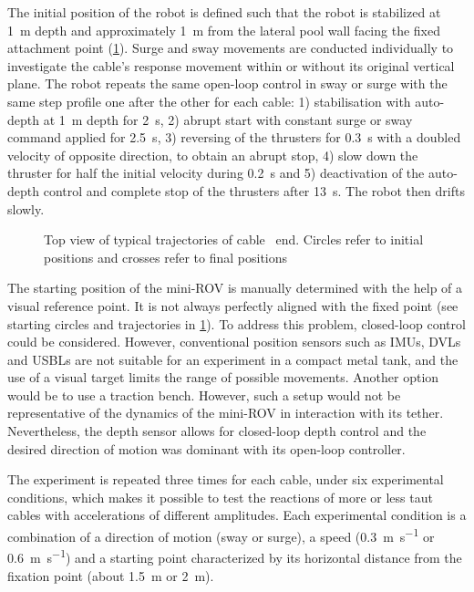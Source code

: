 The initial position of the robot is defined such that the robot is stabilized at \qty{1}{\m} depth
and approximately \qty{1}{\m} from the lateral pool wall facing the fixed attachment point
(\cref{cable_modelization_fig_all_trajectories}). Surge and sway movements are conducted
individually to investigate the cable's response movement within or without its original vertical
plane. The robot repeats the same open-loop control in sway or surge with the same step profile one
after the other for each cable: 1) stabilisation with auto-depth at \qty{1}{\m} depth for
\qty{2}{\s}, 2) abrupt start with constant surge or sway command applied for \qty{2.5}{\s}, 3)
reversing of the thrusters for \qty{0.3}{\s} with a doubled velocity of opposite direction, to
obtain an abrupt stop, 4) slow down the thruster for half the initial velocity during \qty{0.2}{\s}
and 5) deactivation of the auto-depth control and complete stop of the thrusters after
\qty{13}{\s}. The robot then drifts slowly.

\begin{figure}
	\centering
	\caption{
		Top view of typical trajectories of cable~ end.
		Circles refer to initial positions and crosses refer to final positions
	}
	\label{cable_modelization_fig_all_trajectories}
\end{figure}

The starting position of the mini-ROV is manually determined with the help of a visual reference
point. It is not always perfectly aligned with the fixed point (see starting circles and
trajectories in \cref{cable_modelization_fig_all_trajectories}). To address this problem,
closed-loop control could be considered. However, conventional position sensors such as IMUs, DVLs
and USBLs are not suitable for an experiment in a compact metal tank, and the use of a visual
target limits the range of possible movements. Another option would be to use a traction bench.
However, such a setup would not be representative of the dynamics of the mini-ROV in interaction
with its tether. Nevertheless, the depth sensor allows for closed-loop depth control and the
desired direction of motion was dominant with its open-loop controller.

The experiment is repeated three times for each cable, under six experimental conditions, which
makes it possible to test the reactions of more or less taut cables with accelerations of different
amplitudes. Each experimental condition is a combination of a direction of motion (sway or surge),
a speed (\qty{0.3}{\m\per\s} or \qty{0.6}{\m\per\s}) and a starting point characterized by its
horizontal distance from the fixation point (about \qty{1.5}{\m} or \qty{2}{\m}).

